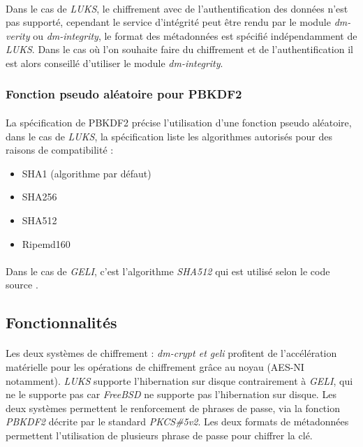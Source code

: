 \paragraph{}
Dans le cas de {\em LUKS}, le chiffrement avec de l'authentification des 
données n'est pas supporté, cependant le service d'intégrité peut être rendu 
par le module {\em dm-verity} ou {\em dm-integrity}, le format des métadonnées 
est spécifié indépendamment de {\em LUKS}. Dans le cas où l'on souhaite faire 
du chiffrement et de l'authentification il est alors conseillé d'utiliser le 
module {\em dm-integrity}.

\subsubsection{Fonction pseudo aléatoire pour PBKDF2}
\paragraph{}
La spécification de PBKDF2 \cite{PKCS5v2} précise l'utilisation d'une fonction
pseudo aléatoire, dans le cas de {\em LUKS}, la spécification 
\cite{onDiskFormatLuks} liste les algorithmes autorisés
pour des raisons de compatibilité :
\begin{itemize}
	\item SHA1 (algorithme par défaut)
	\item SHA256
	\item SHA512
	\item Ripemd160
\end{itemize}
\paragraph{}
Dans le cas de {\em GELI}, c'est l'algorithme {\em SHA512} qui est utilisé
selon le code source \cite{geliPkcs5v2.c}.
\subsection{Fonctionnalités}
\paragraph{}
Les deux systèmes de chiffrement : {\em dm-crypt \em et \em geli} profitent 
de l'accélération matérielle pour les opérations de chiffrement grâce au 
noyau (AES-NI notamment). {\em LUKS} supporte l'hibernation sur disque 
contrairement à {\em GELI}, qui ne le supporte pas car {\em FreeBSD} ne 
supporte pas l'hibernation sur disque. Les deux systèmes permettent le 
renforcement de phrases de passe, via la fonction {\em PBKDF2} décrite 
par le standard {\em PKCS\#5v2}. Les deux formats de métadonnées 
permettent l'utilisation de plusieurs phrase de passe pour chiffrer la clé.

